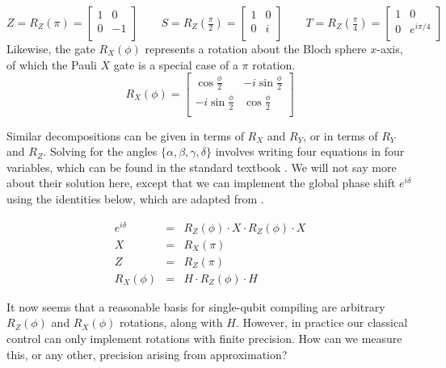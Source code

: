 \begin{equation}
Z = R_Z(\pi) =
\left[
  \begin{array}{cc}
    1 & 0 \\
    0 & -1 \\
  \end{array} \right]
\qquad
S = R_Z(\tfrac{\pi}{2}) =
\left[
  \begin{array}{cc}
    1 & 0 \\
    0 & i \\
  \end{array} \right]
\qquad
T = R_Z(\tfrac{\pi}{4}) =
\left[
  \begin{array}{cc}
    1 & 0 \\
    0 & e^{i\pi / 4} \\
  \end{array} \right]
\end{equation}
%
Likewise, the gate $R_X(\phi)$ represents a rotation about the Bloch sphere $x$-axis,
of which the Pauli $X$ gate is a special case of a $\pi$ rotation.
%
\begin{equation}
R_X(\phi) =
\left[
  \begin{array}{cc}
    \cos \tfrac{\phi}{2} & -i \sin \tfrac{\phi}{2} \\
    -i \sin \tfrac{\phi}{2} & \cos \tfrac{\phi}{2} \\
  \end{array} \right]
\end{equation}

Similar decompositions can be given in terms of $R_X$ and $R_Y$, or in
terms of $R_Y$ and $R_Z$. Solving for the angles $\{ \alpha, \beta, \gamma, \delta \}$
involves writing four equations in four variables, which can be found in
the standard textbook \cite{Nielsen2000}. We will not say
more about their solution here, except that we can implement the
global phase shift $e^{i\delta}$ using the identities below, which are
adapted from \cite{Kitaev2002}.

\begin{eqnarray}
e^{i\delta} & = & R_Z(\phi)\cdot X \cdot R_Z(\phi) \cdot X \\
X & = & R_X(\pi) \\
Z & = & R_Z(\pi) \\
R_X(\phi) & = & H \cdot R_Z(\phi) \cdot H
\end{eqnarray}

It now seems that a reasonable basis for single-qubit compiling are
arbitrary $R_Z(\phi)$ and $R_X(\phi)$ rotations, along with $H$.
However, in practice our classical control can only implement
rotations with finite precision. How can we measure this, or any
other, precision arising from approximation?

